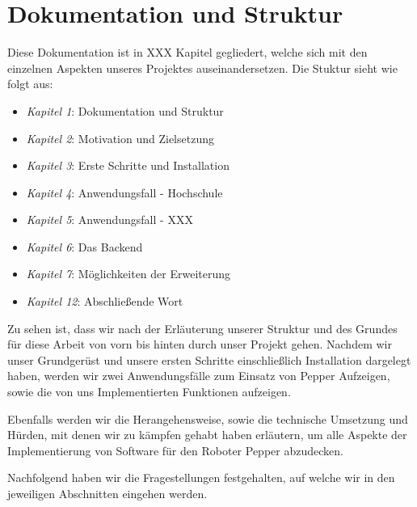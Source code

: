 \chapter{Dokumentation und Struktur}
\label{Dokumentation und Struktur}

Diese Dokumentation ist in XXX Kapitel gegliedert, welche sich mit den einzelnen Aspekten unseres Projektes auseinandersetzen.
Die Stuktur sieht wie folgt aus:

\begin{itemize}
	\item \textit{Kapitel 1}: Dokumentation und Struktur
	\item \textit{Kapitel 2}: Motivation und Zielsetzung
	\item \textit{Kapitel 3}: Erste Schritte und Installation
	\item \textit{Kapitel 4}: Anwendungsfall -  Hochschule
	\item \textit{Kapitel 5}: Anwendungsfall - XXX
	\item \textit{Kapitel 6}: Das Backend
	\item \textit{Kapitel 7}: Möglichkeiten der Erweiterung %
	\item \textit{Kapitel 12}: Abschließende Wort
\end{itemize}

Zu sehen ist, dass wir nach der Erläuterung unserer Struktur und des Grundes für diese Arbeit
von vorn bis hinten durch unser Projekt gehen. Nachdem wir unser Grundgerüst
und unsere ersten Schritte einschließlich Installation dargelegt haben, werden wir zwei Anwendungsfälle zum Einsatz von Pepper
Aufzeigen, sowie die von uns Implementierten Funktionen aufzeigen.

Ebenfalls werden wir die Herangehensweise, sowie die technische Umsetzung und Hürden, mit denen wir zu kämpfen gehabt haben erläutern, um alle Aspekte
der Implementierung von Software für den Roboter Pepper abzudecken.

Nachfolgend haben wir die Fragestellungen festgehalten, auf welche wir in den jeweiligen Abschnitten eingehen werden.

